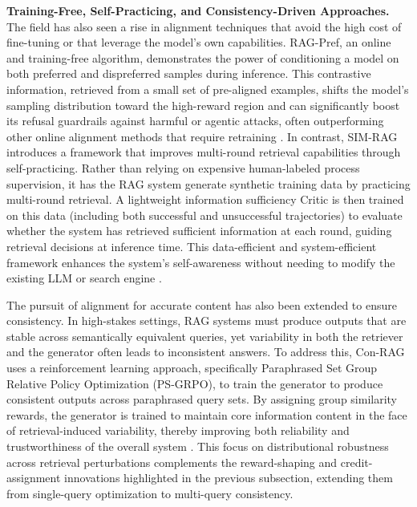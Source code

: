 \documentclass[11pt]{article}
\begin{document}
\textbf{Training-Free, Self-Practicing, and Consistency-Driven Approaches.} The field has also seen a rise in alignment techniques that avoid the high cost of fine-tuning or that leverage the model's own capabilities. RAG-Pref, an online and training-free algorithm, demonstrates the power of conditioning a model on both preferred and dispreferred samples during inference. This contrastive information, retrieved from a small set of pre-aligned examples, shifts the model's sampling distribution toward the high-reward region and can significantly boost its refusal guardrails against harmful or agentic attacks, often outperforming other online alignment methods that require retraining \cite{ref281}. In contrast, SIM-RAG introduces a framework that improves multi-round retrieval capabilities through self-practicing. Rather than relying on expensive human-labeled process supervision, it has the RAG system generate synthetic training data by practicing multi-round retrieval. A lightweight information sufficiency Critic is then trained on this data (including both successful and unsuccessful trajectories) to evaluate whether the system has retrieved sufficient information at each round, guiding retrieval decisions at inference time. This data-efficient and system-efficient framework enhances the system's self-awareness without needing to modify the existing LLM or search engine \cite{ref282}.

The pursuit of alignment for accurate content has also been extended to ensure consistency. In high-stakes settings, RAG systems must produce outputs that are stable across semantically equivalent queries, yet variability in both the retriever and the generator often leads to inconsistent answers. To address this, Con-RAG uses a reinforcement learning approach, specifically Paraphrased Set Group Relative Policy Optimization (PS-GRPO), to train the generator to produce consistent outputs across paraphrased query sets. By assigning group similarity rewards, the generator is trained to maintain core information content in the face of retrieval-induced variability, thereby improving both reliability and trustworthiness of the overall system \cite{ref283}. This focus on distributional robustness across retrieval perturbations complements the reward-shaping and credit-assignment innovations highlighted in the previous subsection, extending them from single-query optimization to multi-query consistency.
\end{document}
